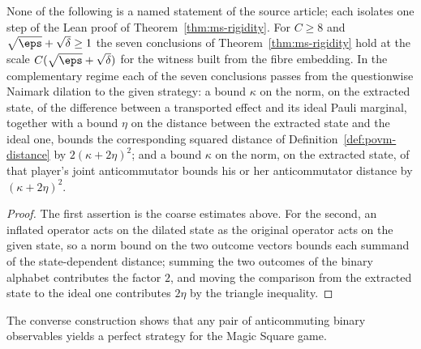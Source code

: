 \begin{lemma}\label{lem:ms-rigidity-support-transfer}
	\leanok
	None of the following is a named statement of the source article; each isolates one step of the Lean proof of Theorem~\ref{thm:ms-rigidity}. For $C \ge 8$ and $\sqrt\eps + \sqrt\delta \ge 1$ the seven conclusions of Theorem~\ref{thm:ms-rigidity} hold at the scale $C(\sqrt\eps + \sqrt\delta)$ for the witness built from the fibre embedding. In the complementary regime each of the seven conclusions passes from the questionwise Naimark dilation to the given strategy: a bound $\kappa$ on the norm, on the extracted state, of the difference between a transported effect and its ideal Pauli marginal, together with a bound $\eta$ on the distance between the extracted state and the ideal one, bounds the corresponding squared distance of Definition~\ref{def:povm-distance} by $2(\kappa + 2\eta)^2$; and a bound $\kappa$ on the norm, on the extracted state, of that player's joint anticommutator bounds his or her anticommutator distance by $(\kappa + 2\eta)^2$.
\end{lemma}
\begin{proof}
	\leanok
	The first assertion is the coarse estimates above. For the second, an inflated operator acts on the dilated state as the original operator acts on the given state, so a norm bound on the two outcome vectors bounds each summand of the state-dependent distance; summing the two outcomes of the binary alphabet contributes the factor $2$, and moving the comparison from the extracted state to the ideal one contributes $2\eta$ by the triangle inequality.
\end{proof}

The converse construction shows that any pair of anticommuting binary observables yields a perfect strategy for the Magic Square game.

